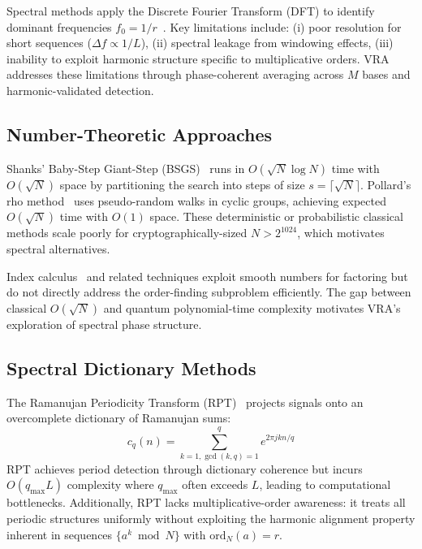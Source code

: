 \documentclass[10pt,twocolumn]{article}
\begin{document}
Spectral methods apply the Discrete Fourier Transform (DFT) to identify dominant frequencies $f_0 = 1/r$~\cite{oppenheim1999,rabiner1978}. Key limitations include: (i) poor resolution for short sequences ($\Delta f \propto 1/L$), (ii) spectral leakage from windowing effects, (iii) inability to exploit harmonic structure specific to multiplicative orders. VRA addresses these limitations through phase-coherent averaging across $M$ bases and harmonic-validated detection.

\subsection{Number-Theoretic Approaches}

Shanks' Baby-Step Giant-Step (BSGS)~\cite{shanks1971} runs in $O(\sqrt{N} \log N)$ time with $O(\sqrt{N})$ space by partitioning the search into steps of size $s = \lceil \sqrt{N} \rceil$. Pollard's rho method~\cite{pollard1975,pollard1978} uses pseudo-random walks in cyclic groups, achieving expected $O(\sqrt{N})$ time with $O(1)$ space. These deterministic or probabilistic classical methods scale poorly for cryptographically-sized $N > 2^{1024}$, which motivates spectral alternatives.

Index calculus~\cite{schmidt1976} and related techniques exploit smooth numbers for factoring but do not directly address the order-finding subproblem efficiently. The gap between classical $O(\sqrt{N})$ and quantum polynomial-time complexity motivates VRA's exploration of spectral phase structure.

\subsection{Spectral Dictionary Methods}

The Ramanujan Periodicity Transform (RPT)~\cite{vaidyanathan2014,pal2016} projects signals onto an overcomplete dictionary of Ramanujan sums:
\begin{equation*}
c_q(n) = \sum_{k=1, \gcd(k,q)=1}^q e^{2\pi j k n / q}
\end{equation*}
RPT achieves period detection through dictionary coherence but incurs $O(q_{\max} L)$ complexity where $q_{\max}$ often exceeds $L$, leading to computational bottlenecks. Additionally, RPT lacks multiplicative-order awareness: it treats all periodic structures uniformly without exploiting the harmonic alignment property inherent in sequences $\{a^k \bmod N\}$ with $\text{ord}_N(a) = r$.
\end{document}
